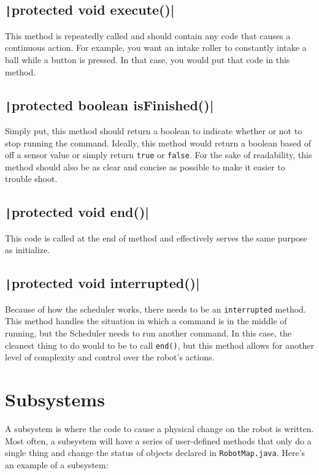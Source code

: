 \documentclass[11pt,fleqn]{article}
\newcommand{\mil}[2][java]{\texttt|#2|}
\begin{document}
\subsection{\mil{protected void execute()}}
This method is repeatedly called and should contain any code that causes a continuous action. For
example, you want an intake roller to constantly intake a ball while a button is pressed. In that
case, you would put that code in this method.

\subsection{\mil{protected boolean isFinished()}}
Simply put, this method should return a boolean to indicate whether or not to stop running the
command. Ideally, this method would return a boolean based of off a sensor value or simply return
\texttt{true} or \texttt{false}. For the sake of readability, this method should also be as clear
and concise as possible to make it easier to trouble shoot.

\subsection{\mil{protected void end()}}
This code is called at the end of method and effectively serves the same purpose as initialize.

\subsection{\mil{protected void interrupted()}}
Because of how the scheduler works, there needs to be an \texttt{interrupted} method. This method
handles the situation in which a command is in the middle of running, but the Scheduler needs to run
another command. In this case, the cleanest thing to do would to be to call \texttt{end()}, but this
method allows for another level of complexity and control over the robot's actions.

\section{Subsystems}
A subsystem is where the code to cause a physical change on the robot is written. Most often, a
subsystem will have a series of user-defined methods that only do a single thing and change the
status of objects declared in \texttt{RobotMap.java}. Here's an example of a subsystem:
\end{document}

